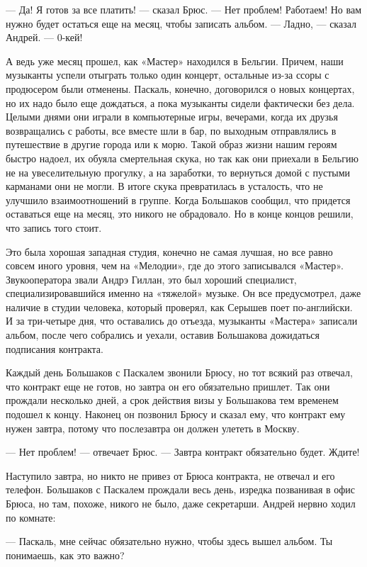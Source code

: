 \documentclass[16pt,a5paper,oneside]{book}
\begin{document}
— Да! Я готов за все платить! — сказал Брюс. — Нет проблем! Работаем! Но вам нужно будет остаться еще на месяц, чтобы
записать альбом.
— Ладно, — сказал Андрей. — 0-кей!

А ведь уже месяц прошел, как «Мастер» находился в Бельгии. Причем, наши музыканты успели отыграть только один концерт,
остальные из-за ссоры с продюсером были отменены. Паскаль, конечно, договорился о новых концертах, но их надо было еще
дождаться, а пока музыканты сидели фактически без дела. Целыми днями они играли в компьютерные игры, вечерами, когда их
друзья возвращались с работы, все вместе шли в бар, по выходным отправлялись в путешествие в другие города или к морю.
Такой образ жизни нашим героям быстро надоел, их обуяла смертельная скука, но так как они приехали в Бельгию не на
увеселительную прогулку, а на заработки, то вернуться домой с пустыми карманами они не могли. В итоге скука превратилась
в усталость, что не улучшило взаимоотношений в группе. Когда Большаков сообщил, что придется оставаться еще на месяц,
это никого не обрадовало. Но в конце концов решили, что запись того стоит.

Это была хорошая западная студия, конечно не самая лучшая, но все равно совсем иного уровня, чем на «Мелодии», где до
этого записывался «Мастер». Звукооператора звали Андрэ Гиллан, это был хороший специалист, специализировавшийся именно
на «тяжелой» музыке. Он все предусмотрел, даже наличие в студии человека, который проверял, как Серышев поет
по-английски. И за три-четыре дня, что оставались до отъезда, музыканты «Мастера» записали альбом, после чего собрались
и уехали, оставив Большакова дожидаться подписания контракта.

Каждый день Большаков с Паскалем звонили Брюсу, но тот всякий раз отвечал, что контракт еще не готов, но завтра он его
обязательно пришлет. Так они прождали несколько дней, а срок действия визы у Большакова тем временем подошел к концу.
Наконец он позвонил Брюсу и сказал ему, что контракт ему нужен завтра, потому что послезавтра он должен улететь в
Москву.

— Нет проблем! — отвечает Брюс. — Завтра контракт обязательно будет. Ждите!

Наступило завтра, но никто не привез от Брюса контракта, не отвечал и его телефон. Большаков с Паскалем прождали весь
день, изредка позванивая в офис Брюса, но там, похоже, никого не было, даже секретарши. Андрей нервно ходил по комнате:

— Паскаль, мне сейчас обязательно нужно, чтобы здесь вышел альбом. Ты понимаешь, как это важно?
\end{document}
